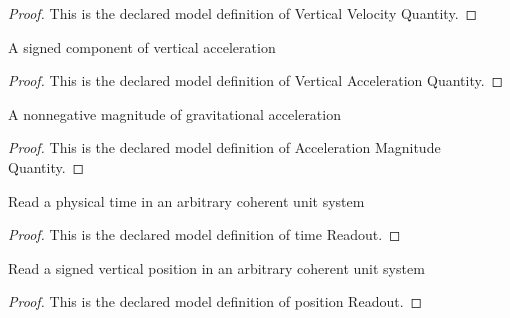 \begin{proof}
  This is the declared model definition of Vertical Velocity Quantity.
\end{proof}
\begin{definition}
  \label{def:physics:phyx-mini-0795:phyxminiproblems-problemphyxmini0795-verticalaccelerationquantity}
  A signed component of vertical acceleration
\end{definition}
\begin{proof}
  This is the declared model definition of Vertical Acceleration Quantity.
\end{proof}
\begin{definition}
  \label{def:physics:phyx-mini-0795:phyxminiproblems-problemphyxmini0795-accelerationmagnitudequantity}
  A nonnegative magnitude of gravitational acceleration
\end{definition}
\begin{proof}
  This is the declared model definition of Acceleration Magnitude Quantity.
\end{proof}
\begin{definition}
  \label{def:physics:phyx-mini-0795:phyxminiproblems-problemphyxmini0795-timereadout}
  Read a physical time in an arbitrary coherent unit system
\end{definition}
\begin{proof}
  This is the declared model definition of time Readout.
\end{proof}
\begin{definition}
  \label{def:physics:phyx-mini-0795:phyxminiproblems-problemphyxmini0795-positionreadout}
  Read a signed vertical position in an arbitrary coherent unit system
\end{definition}
\begin{proof}
  This is the declared model definition of position Readout.
\end{proof}
